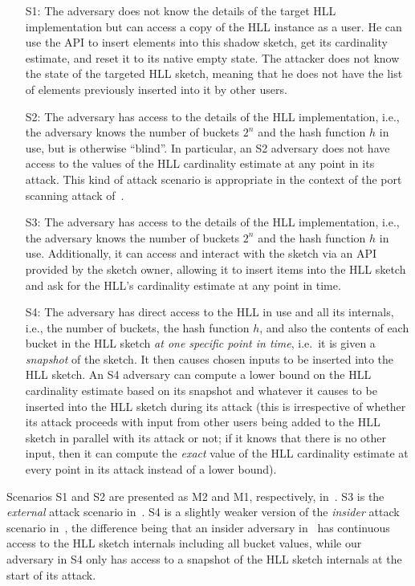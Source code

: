 \documentclass[11pt]{article}
\begin{document}
\begin{itemize}
\item[S1:] The adversary does not know the details of the target HLL implementation but can access a copy of the HLL instance as a user. He can use the API to insert elements into this shadow sketch, get its cardinality estimate, and reset it to its native empty state. The attacker does not know the state of the targeted HLL sketch, meaning that he does not have the list of elements previously inserted into it by other users.
\item[S2:] The adversary has access to the details of the HLL implementation, i.e., the adversary knows the number of buckets $2^n$ and the hash function $h$ in use, but is otherwise ``blind''. In particular, an S2 adversary does not have access to the values of the HLL cardinality estimate at any point in its attack. This kind of attack scenario is appropriate in the context of the port scanning attack of~\cite{portscanhll}.
\item[S3:] The adversary has access to the details of the HLL implementation, i.e., the adversary knows the number of buckets $2^n$ and the hash function $h$ in use. Additionally, it can access and interact with the sketch via an API provided by the sketch owner, allowing it to insert items into the HLL sketch and ask for the HLL's cardinality estimate at any point in time.
\item[S4:] The adversary has direct access to the HLL in use and all its internals, i.e., the number of buckets, the hash function $h$, and also the contents of each bucket in the HLL sketch \emph{at one specific point in time}, i.e.\ it is given a \emph{snapshot} of the sketch. It then causes chosen inputs to be inserted into the HLL sketch. An S4 adversary can compute a lower bound on the HLL cardinality estimate based on its snapshot and whatever it causes to be inserted into the HLL sketch during its attack (this is irrespective of whether its attack proceeds with input from other users being added to the HLL sketch in parallel with its attack or not; if it knows that there is no other input, then it can compute the \emph{exact} value of the HLL cardinality estimate at every point in its attack instead of a lower bound).
\end{itemize}

Scenarios S1 and S2 are presented as M2 and M1, respectively, in~\cite{hllvuln}. S3 is the \textit{external} attack scenario in~\cite{cardestprivacy}. S4 is a slightly weaker version of the \textit{insider} attack scenario in~\cite{cardestprivacy}, the difference being that an insider adversary in~\cite{cardestprivacy} has continuous access to the HLL sketch internals including all bucket values, while our adversary in S4 only has access to a snapshot of the HLL sketch internals at the start of its attack.
\end{document}
